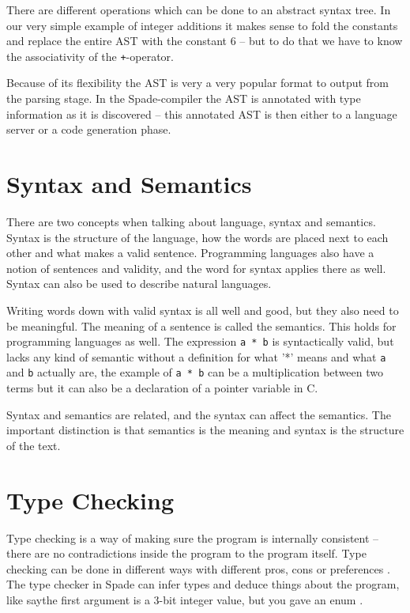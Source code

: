 There are different operations which can be done to an abstract syntax tree. In our very simple example of integer additions it makes sense to fold the constants and replace the entire AST with the constant 6 -- but to do that we have to know the associativity of the \verb!+!-operator.

Because of its flexibility the AST is very a very popular format to output from the parsing stage. In the Spade-compiler the AST is annotated with type information as it is discovered -- this annotated AST is then either to a language server or a code generation phase.

\section{Syntax and Semantics}
There are two concepts when talking about language, syntax and semantics. Syntax is the structure of the language, how the words are placed next to each other and what makes a valid sentence. Programming languages also have a notion of sentences and validity, and the word for syntax applies there as well. Syntax can also be used to describe natural languages.

Writing words down with valid syntax is all well and good, but they also need to be meaningful. The meaning of a sentence is called the semantics. This holds for programming languages as well. The expression \verb+a * b+ is syntactically valid, but lacks any kind of semantic without a definition for what '*' means and what \verb+a+ and \verb+b+ actually are, the example of \verb+a * b+ can be a multiplication between two terms but it can also be a declaration of a pointer variable in C.

Syntax and semantics are related, and the syntax can affect the semantics. The important distinction is that semantics is the meaning and syntax is the structure of the text.

\section{Type Checking} %
\label{sec:TypeChecking}
Type checking is a way of making sure the program is internally consistent -- there are no contradictions inside the program to the program itself. Type checking can be done in different ways with different pros, cons or preferences \cite{src:TypeCheckersBook}. The type checker in Spade can infer types and deduce things about the program, like say{the first argument is a 3-bit integer value, but you gave an enum} \cite{src:spadeAnHDL}.

